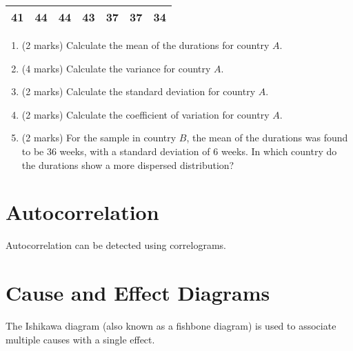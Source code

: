 \begin{enumerate}
\begin{enumerate}
		\begin{table}[ht]
			\begin{center}
				\begin{tabular}{|rrrrrrr|}
					
					\hline
					41 & 44 & 44 & 43 & 37 & 37 & 34  \\
					\hline
				\end{tabular}
			\end{center}
		\end{table}
		\vspace{-0.5cm}
		
		
		\begin{enumerate}
			\item (2 marks) Calculate the mean of the durations for country $A$.
			\item (4 marks) Calculate the variance for country $A$.
			\item (2 marks) Calculate the standard deviation for country $A$.
			\item (2 marks) Calculate the coefficient of variation for country $A$.
			
			\item (2 marks) For the sample in country $B$, the mean of the durations was found to be 36 weeks, with a standard deviation of 6 weeks. In which country do the durations show a more dispersed distribution?
			
		\end{enumerate}
		
		
	\end{enumerate}
	\newpage
	
	
	
\end{enumerate}
\newpage


\section{Autocorrelation}

Autocorrelation can be detected using correlograms.
\section{Cause and Effect Diagrams}

The Ishikawa diagram (also known as a fishbone diagram)
is used to associate multiple causes with a single effect.






